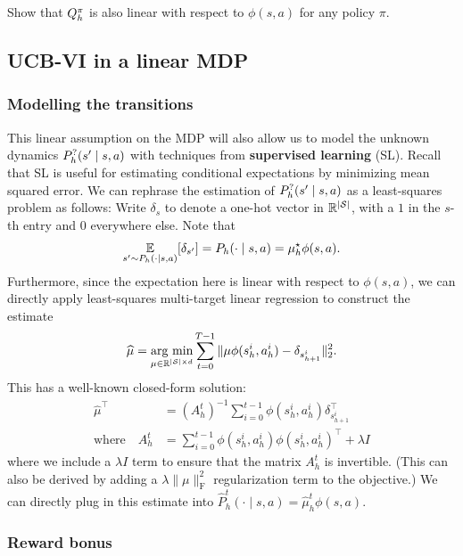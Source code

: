 \documentclass[\main/main]{subfiles}
\begin{document}
\begin{exercise}
    Show that $Q^\pi_h$ is also linear with respect to $\phi(s, a)$ for any policy $\pi$.
\end{exercise}


\subsection{UCB-VI in a linear MDP}
\label{sec:lin_ucb_vi}

\subsubsection{Modelling the transitions}

This linear assumption on the MDP will also allow us to model the unknown dynamics $P^?_h(s' \mid s, a)$ with techniques from \textbf{supervised learning} (SL).
Recall that SL is useful for estimating conditional expectations by minimizing mean squared error.
We can rephrase the estimation of $P^?_h(s' \mid s, a)$ as a least-squares problem as follows:
Write $\delta_s$ to denote a one-hot vector in $\mathbb{R}^{|\mathcal{S}|}$, with a $1$ in the $s$-th entry and $0$ everywhere else.
Note that \[
    \operatorname*{\mathbb{E}}_{s' \sim P_h(\cdot \mid s, a)} [\delta_{s'}] = P_h(\cdot \mid s, a) = \mu_h^\star \phi(s, a).
\]
Furthermore, since the expectation here is linear with respect to $\phi(s, a)$, we can directly apply least-squares multi-target linear regression to construct the estimate
\[
    \widehat \mu = \operatorname*{\textrm{arg\ min}}_{\mu \in \mathbb{R}^{|\mathcal{S}| \times d}} \sum_{t=0}^{T-1} \|\mu \phi(s_h^i, a_h^i) - \delta_{s_{h+1}^i} \|_2^2.
\]
This has a well-known closed-form solution:
\begin{align*}
    \hat \mu^\top            & = (A_h^t)^{-1} \sum_{i=0}^{t-1} \phi(s_h^i, a_h^i) \delta_{s_{h+1}^i}^\top \\
    \text{where} \quad A_h^t & = \sum_{i=0}^{t-1} \phi(s_h^i, a_h^i) \phi(s_h^i, a_h^i)^\top + \lambda I
\end{align*}
where we include a $\lambda I$ term to ensure that the matrix $A^t_h$ is invertible. (This can also be derived by adding a $\lambda \|\mu\|_{\text{F}}^2$ regularization term to the objective.)
We can directly plug in this estimate into $\hat{P}^t_h(\cdot \mid s, a) = \hat \mu^t_h \phi(s, a)$.

\subsubsection{Reward bonus}
\end{document}
